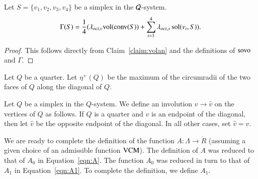 \begin{lemma}\label{lemma:gammavol}
Let $S=\{v_1,v_2,v_3,v_4\}$ be a simplex in the ${\mathcal Q}$-system.
    $$\Gamma(S) = \frac{1}{4}(\lambda_{oct,v}{\operatorname{vol}}({\operatorname{conv}}(S)) +\sum_{i=1}^4
    \lambda_{oct,s}\operatorname{sol}(v_i,S)).
    $$
\end{lemma}

\begin{proof} This follows directly from Claim~\ref{claim:volan}
and the definitions of ${\operatorname{sovo}}$ and $\Gamma$.
\end{proof}

\begin{definition}
Let $Q$ be a quarter.   Let $\eta^+(Q)$ be the maximum of the
circumradii of the two faces of $Q$ along the diagonal of $Q$.
\end{definition}

Let $Q$ be a simplex in the $Q$-system.  We define an involution
$v\to \hat v$ on the vertices of $Q$ as follows.  If $Q$ is a
quarter and $v$ is an endpoint of the diagonal, then let $\hat v$
be the opposite endpoint of the diagonal.  In all other cases, set
$\hat v = v$.

We are ready to complete the definition of the function
$A:\Lambda\to\ring{R}$ (assuming a given choice of an admissible
function ${\operatorname{VCM}}$). The definition of $A$ was reduced to that of
$A_0$ in Equation~\ref{eqn:A}.  The function $A_0$ was reduced in
turn to that of $A_1$ in Equation~\ref{eqn:A1}. To complete the
definition, we define $A_1$.

